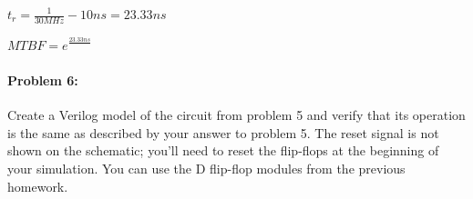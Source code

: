 \documentclass[12pt,letterpaper,titlepage]{article}
\begin{document}
\begin{raggedright}
$t_r = \frac{1}{30MHz} - 10ns = 23.33ns$

$MTBF = e^{\frac{23.33ns}{}}$

\paragraph{Problem 6: }
Create a Verilog model of the circuit from problem 5 and verify that its operation is the same as described by your answer to problem 5. The reset signal is not shown on the schematic; you'll need to reset the flip-flops at the beginning of your simulation. You can use the D flip-flop modules from the previous homework.

\end{raggedright}
\end{document}
